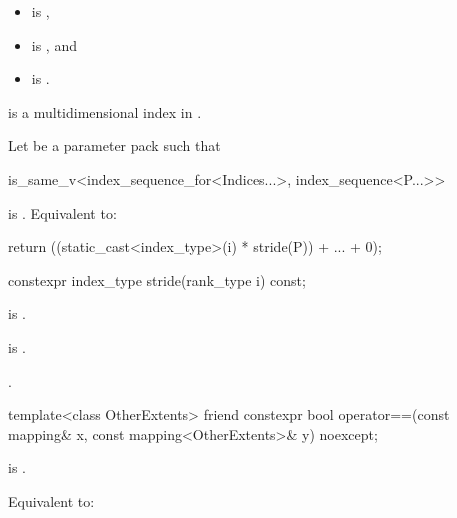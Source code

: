 \begin{itemdescr}
\pnum
\constraints
\begin{itemize}
\item
{} is ,
\item
{} is , and
\item
{} is .
\end{itemize}

\pnum
\expects
{} is
a multidimensional index in .

\pnum
\effects
Let  be a parameter pack such that
\begin{codeblock}
is_same_v<index_sequence_for<Indices...>, index_sequence<P...>>
\end{codeblock}
is .
Equivalent to:
\begin{codeblock}
return ((static_cast<index_type>(i) * stride(P)) + ... + 0);
\end{codeblock}
\end{itemdescr}

%
\begin{itemdecl}
constexpr index_type stride(rank_type i) const;
\end{itemdecl}

\begin{itemdescr}
\pnum
\constraints
{} is .

\pnum
\expects
{} is .

\pnum
\returns
{}.
\end{itemdescr}

%
\begin{itemdecl}
template<class OtherExtents>
  friend constexpr bool operator==(const mapping& x, const mapping<OtherExtents>& y) noexcept;
\end{itemdecl}

\begin{itemdescr}
\pnum
\constraints
{} is .

\pnum
\effects
Equivalent to: 
\end{itemdescr}

